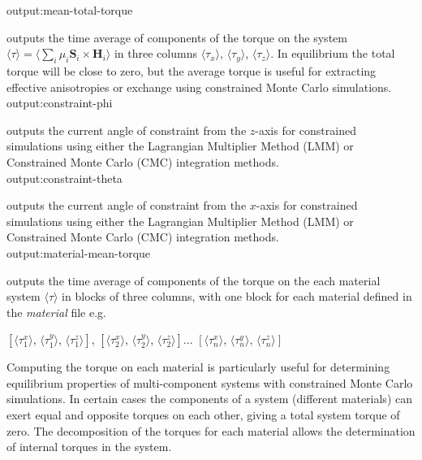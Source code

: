 {\zicf output:mean-total-torque}
outputs the time average of components of the torque on the system $\langle\tau\rangle =
\langle\sum_i \mu_i \mathbf{S}_i \times \mathbf{H}_i \rangle$ in three columns $\langle\tau_x
\rangle$, $\langle\tau_y \rangle$, $\langle\tau_z \rangle$. In equilibrium the total torque
will be close to zero, but the average torque is useful for extracting effective anisotropies
or exchange using constrained Monte Carlo simulations.\\

{\zicf output:constraint-phi} outputs
the current angle of constraint from the $z$-axis for constrained simulations using either the
Lagrangian Multiplier Method (LMM) or Constrained Monte Carlo (CMC) integration methods.\\

{\zicf output:constraint-theta}
outputs the current angle of constraint from the $x$-axis for constrained simulations using
either the Lagrangian Multiplier Method (LMM) or Constrained Monte Carlo (CMC) integration methods.\\



{\zicf output:material-mean-torque}
outputs the time average of components of the torque on the each material system $\langle\tau\rangle$
in blocks of three columns, with one block for each material defined in the \textit{material} file e.g.

\begin{center}
$\left[ \langle\tau_1^x \rangle \right.$, $\langle\tau_1^y \rangle$, $\left. \langle\tau_1^z \rangle \right]$,
$\left[ \langle\tau_2^x \rangle \right.$, $\langle\tau_2^y \rangle$, $\left. \langle\tau_2^z \rangle \right]$...
$\left[ \langle\tau_n^x \rangle \right.$, $\langle\tau_n^y \rangle$, $\left. \langle\tau_n^z \rangle \right]$
\end{center}

Computing the torque on each material is particularly useful for determining equilibrium
properties of multi-component systems with constrained Monte Carlo simulations. In certain
cases the components of a system (different materials) can exert equal and opposite torques
on each other, giving a total system torque of zero. The decomposition of the torques for
each material allows the determination of internal torques in the system.\\

